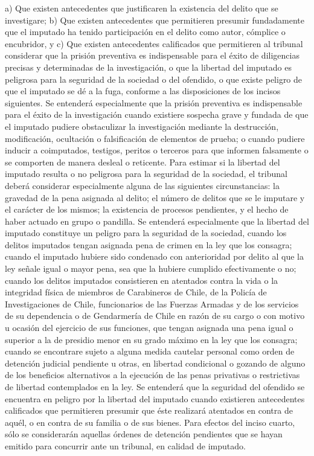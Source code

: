     a) Que existen antecedentes que justificaren la existencia del delito que se investigare;
    b) Que existen antecedentes que permitieren presumir fundadamente que el imputado ha tenido participación en el delito como autor, cómplice o encubridor, y
    c) Que existen antecedentes calificados que permitieren al tribunal considerar que la prisión preventiva es indispensable para el éxito de diligencias precisas y determinadas de la investigación, o que la libertad del imputado es peligrosa para la seguridad de la sociedad o del ofendido, o que existe peligro de que el imputado se dé a la fuga, conforme a las disposiciones de los incisos siguientes.
    Se entenderá especialmente que la prisión preventiva es indispensable para el éxito de la investigación cuando existiere sospecha grave y fundada de que el imputado pudiere obstaculizar la investigación mediante la destrucción, modificación, ocultación o falsificación de elementos de prueba; o cuando pudiere inducir a coimputados, testigos, peritos o terceros para que informen falsamente o se comporten de manera desleal o reticente.
    Para estimar si la libertad del imputado resulta o no peligrosa para la seguridad de la sociedad, el tribunal deberá considerar especialmente alguna de las siguientes circunstancias: la gravedad de la pena asignada al delito; el número de delitos que se le imputare y el carácter de los mismos; la existencia de procesos pendientes, y el hecho de haber actuado en grupo o pandilla.
    Se entenderá especialmente que la libertad del imputado constituye un peligro para la seguridad de la sociedad, cuando los delitos imputados tengan asignada pena de crimen en la ley que los consagra; cuando el imputado hubiere sido condenado con anterioridad por delito al que la ley señale igual o mayor pena, sea que la hubiere cumplido efectivamente o no; cuando los delitos imputados consistieren en atentados contra la vida o la integridad física de miembros de Carabineros de Chile, de la Policía de Investigaciones de Chile, funcionarios de las Fuerzas Armadas y de los servicios de su dependencia o de Gendarmería de Chile en razón de su cargo o con motivo u ocasión del ejercicio de sus funciones, que tengan asignada una pena igual o superior a la de presidio menor en su grado máximo en la ley que los consagra; cuando se encontrare sujeto a alguna medida cautelar personal como orden de detención judicial pendiente u otras, en libertad condicional o gozando de alguno de los beneficios alternativos a la ejecución de las penas privativas o restrictivas de libertad contemplados en la ley.
    Se entenderá que la seguridad del ofendido se encuentra en peligro por la libertad del imputado cuando existieren antecedentes calificados que permitieren presumir que éste realizará atentados en contra de aquél, o en contra de su familia o de sus bienes.
    Para efectos del inciso cuarto, sólo se considerarán aquellas órdenes de detención pendientes que se hayan emitido para concurrir ante un tribunal, en calidad de imputado.








